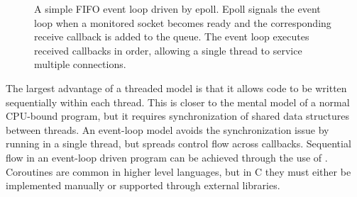 \begin{figure}[htpb]
\centering
{}
\caption[Event loop with FIFO queue]{
A simple FIFO event loop driven by epoll. Epoll signals the event loop when
a monitored socket becomes ready and the corresponding receive callback is
added to the queue.
The event loop executes received callbacks in order,
allowing a single thread to service multiple connections.
} 
\label{fig:event-loop-queue}
\end{figure}


The largest advantage of a threaded model is that it allows code to be written sequentially
within each thread.
This is closer to the mental model of a normal CPU-bound program, but it requires synchronization
of shared data structures between threads. An event-loop model avoids the
synchronization issue by running in a single thread, but spreads control
flow across callbacks. Sequential flow in an event-loop driven program
can be achieved through the use of . Coroutines are common
in higher level languages, but in C they must either be implemented manually
or supported through external libraries.

